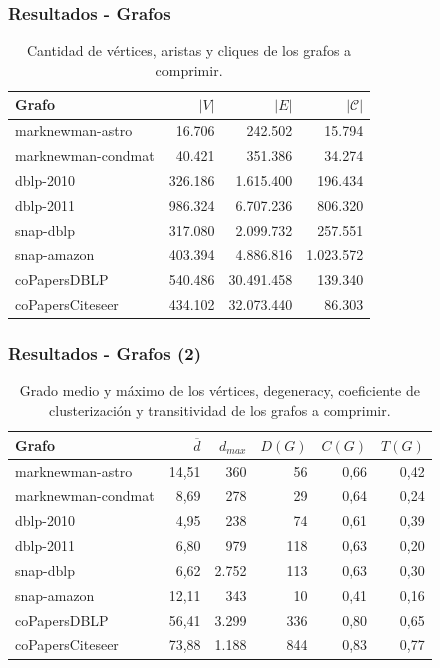 \begin{frame}
\frametitle{Resultados - Grafos}

\begin{table}
	\caption{Cantidad de vértices, aristas y cliques de los grafos a comprimir.}
	\label{table:gafros1}
	\centering
	\footnotesize
	\begin{tabular}{l|r|r|r}
		\toprule
		Grafo & $|V|$ & $|E|$ & $|\mathcal{C}|$ \\
		\midrule
		marknewman-astro & 16.706 & 242.502 & 15.794 \\
		marknewman-condmat & 40.421 & 351.386 & 34.274 \\
		dblp-2010 & 326.186 & 1.615.400 & 196.434 \\
        dblp-2011 & 986.324 & 6.707.236 & 806.320 \\
		snap-dblp & 317.080 & 2.099.732 & 257.551 \\
        snap-amazon & 403.394 & 4.886.816 & 1.023.572 \\
        coPapersDBLP & 540.486 & 30.491.458 & 139.340 \\
        coPapersCiteseer & 434.102 & 32.073.440 & 86.303 \\
    	\bottomrule
	\end{tabular}
\end{table}

\end{frame}

\begin{frame}
\frametitle{Resultados - Grafos (2)}

\begin{table}
	\caption{Grado medio y máximo de los vértices, degeneracy, coeficiente de clusterización y transitividad de los grafos a comprimir.}
	\label{table:gafros2}
	\centering
	\footnotesize
	\begin{tabular}{l|r|r|r|r|r}
		\toprule
		Grafo & $\overline{d}$ & $d_{max}$ & $D(G)$ & $C(G)$ & $T(G)$ \\
		\midrule
		marknewman-astro & 14,51 & 360 & 56 & 0,66 & 0,42  \\
		marknewman-condmat & 8,69 & 278 & 29 & 0,64 & 0,24 \\
		dblp-2010 & 4,95 & 238 & 74 & 0,61 & 0,39  \\
        dblp-2011 & 6,80 & 979 & 118 & 0,63 & 0,20 \\
		snap-dblp & 6,62 & 2.752 & 113 & 0,63 & 0,30 \\
        snap-amazon & 12,11 & 343 & 10 & 0,41 & 0,16 \\
        coPapersDBLP & 56,41 & 3.299 & 336 & 0,80 & 0,65 \\
        coPapersCiteseer & 73,88 & 1.188 & 844 & 0,83 & 0,77 \\
    	\bottomrule
	\end{tabular}
\end{table}

\end{frame}


